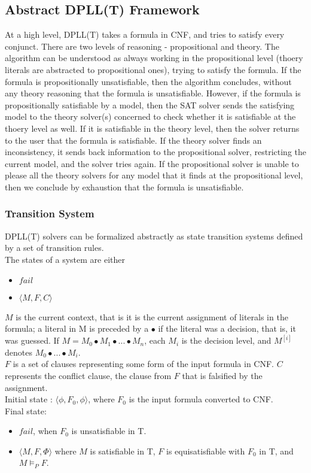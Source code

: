 \documentclass{article}
\begin{document}
\subsection{Abstract DPLL(T) Framework}
\label{sec:abst}
\begin{framed}
	At a high level, DPLL(T) takes a formula in CNF, and tries 
	to satisfy every conjunct. There are two levels of reasoning 
	- propositional and theory. The algorithm can be understood as 
	always working in the propositional level (thoery literals
	are abstracted to propositional ones), trying to 
	satisfy the formula. If the formula is propositionally 
	unsatisfiable, then the algorithm concludes, without any 
	theory reasoning that the formula is unsatisfiable. However, 
	if the formula is propositionally satisfiable by a model, 
	then the SAT solver sends the satisfying model to the 
	theory solver(s) concerned to check whether it is satisfiable
	at the thoery level as well. If it is satisfiable in the 
	theory level, then the solver returns to the user that 
	the formula is satisfiable. If the theory solver finds an 
	inconsistency, it sends back information to the 
	propositional solver, restricting the current model, 
	and the solver tries again. If the propositional solver 
	is unable to please all the theory solvers 
	for any model that it finds at the propositional level, then
	we conclude by exhaustion that the formula is unsatisfiable.
\end{framed}

\subsubsection{Transition System}
	\label{sec:trans}
DPLL(T) solvers can be formalized abstractly as 
state transition systems defined by a set of transition rules.\\
The states of a system are either
\begin{itemize}
	\item $fail$
	\item $\langle M, F, C \rangle$
\end{itemize}
$M$ is the current context, that is it is the current 
assignment of literals in the formula; a literal in M is 
preceded by a $\bullet$ if the literal was a decision, 
that is, it was guessed. 
If $M = M_0 \bullet M_1 \bullet ... \bullet M_n$, 
each $M_i$ is the decision level, and $M^{[i]}$ 
denotes $M_0 \bullet ... \bullet M_i$. \\
$F$ is a set of clauses representing some form of
the input formula in CNF. $C$ represents the conflict clause,
the clause from $F$ that is falsified by the assignment. \\
Initial state : $\langle \phi, F_0, \phi \rangle$, where $F_0$
is the input formula converted to CNF. \\
Final state:
\begin{itemize}
	\item $fail$, when $F_0$ is unsatisfiable in T.
	\item $\langle M, F, \Phi \rangle$ where $M$ is satisfiable in
	T, $F$ is equisatisfiable with $F_0$ in T, and $M \models_P F$.
\end{itemize}
\end{document}
